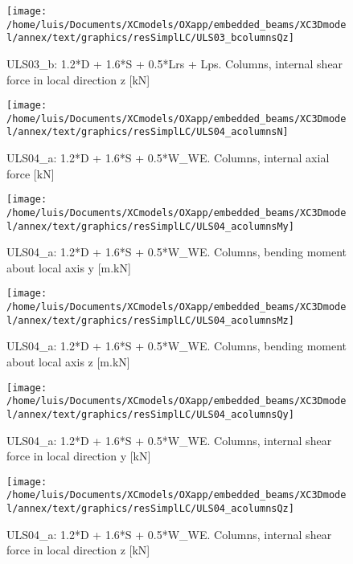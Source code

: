 \begin{figure}
\begin{center}
\texttt{[image: /home/luis/Documents/XCmodels/OXapp/embedded\_beams/XC3Dmodel/annex/text/graphics/resSimplLC/ULS03\_bcolumnsQz]}
\caption{ULS03_b: 1.2*D + 1.6*S + 0.5*Lrs + Lps. Columns, internal shear force in local direction z [kN]}
\end{center}
\end{figure}
\clearpage
\begin{figure}
\begin{center}
\texttt{[image: /home/luis/Documents/XCmodels/OXapp/embedded\_beams/XC3Dmodel/annex/text/graphics/resSimplLC/ULS04\_acolumnsN]}
\caption{ULS04_a: 1.2*D + 1.6*S + 0.5*W_WE. Columns, internal axial force [kN]}
\end{center}
\end{figure}
\begin{figure}
\begin{center}
\texttt{[image: /home/luis/Documents/XCmodels/OXapp/embedded\_beams/XC3Dmodel/annex/text/graphics/resSimplLC/ULS04\_acolumnsMy]}
\caption{ULS04_a: 1.2*D + 1.6*S + 0.5*W_WE. Columns, bending moment about local axis y [m.kN]}
\end{center}
\end{figure}
\begin{figure}
\begin{center}
\texttt{[image: /home/luis/Documents/XCmodels/OXapp/embedded\_beams/XC3Dmodel/annex/text/graphics/resSimplLC/ULS04\_acolumnsMz]}
\caption{ULS04_a: 1.2*D + 1.6*S + 0.5*W_WE. Columns, bending moment about local axis z [m.kN]}
\end{center}
\end{figure}
\begin{figure}
\begin{center}
\texttt{[image: /home/luis/Documents/XCmodels/OXapp/embedded\_beams/XC3Dmodel/annex/text/graphics/resSimplLC/ULS04\_acolumnsQy]}
\caption{ULS04_a: 1.2*D + 1.6*S + 0.5*W_WE. Columns, internal shear force in local direction y [kN]}
\end{center}
\end{figure}
\begin{figure}
\begin{center}
\texttt{[image: /home/luis/Documents/XCmodels/OXapp/embedded\_beams/XC3Dmodel/annex/text/graphics/resSimplLC/ULS04\_acolumnsQz]}
\caption{ULS04_a: 1.2*D + 1.6*S + 0.5*W_WE. Columns, internal shear force in local direction z [kN]}
\end{center}
\end{figure}
